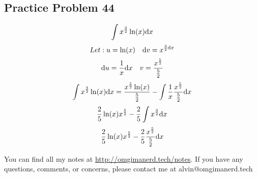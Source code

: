 \documentclass{math}
\begin{document}
\subsection*{Practice Problem 44}
\[ \int{x^{\frac{3}{2}}\ln(x)\mathrm{d}{x}} \]
\[ Let: u = \ln(x) \quad \mathrm{d}{v} = x^{\frac{3}{2}\mathrm{d}{x}} \]
\[ \mathrm{d}{u} = \frac{1}{x}\mathrm{d}{x} \quad v =
   \frac{x^{\frac{5}{2}}}{\frac{5}{2}} \]
\[ \int{x^{\frac{3}{2}}\ln(x)\mathrm{d}{x}}=
   \frac{x^{\frac{5}{2}}\ln(x)}{\frac{5}{2}}-
   \int{\frac{1}{x}\frac{x^{\frac{5}{2}}}{\frac{5}{2}}\mathrm{d}{x}} \]
\[ \frac{2}{5}\ln(x)x^{\frac{5}{2}}-\frac{2}{5}\int{x^{\frac{3}{2}}\mathrm{d}{x}} \]
\[ \frac{2}{5}\ln(x)x^{\frac{5}{2}}-
   \frac{2}{5}\frac{x^{\frac{5}{2}}}{\frac{5}{2}}\mathrm{d}{x} \]

\begin{center}
  You can find all my notes at \url{http://omgimanerd.tech/notes}. If you have
  any questions, comments, or concerns, please contact me at
  alvin@omgimanerd.tech
\end{center}
\end{document}
